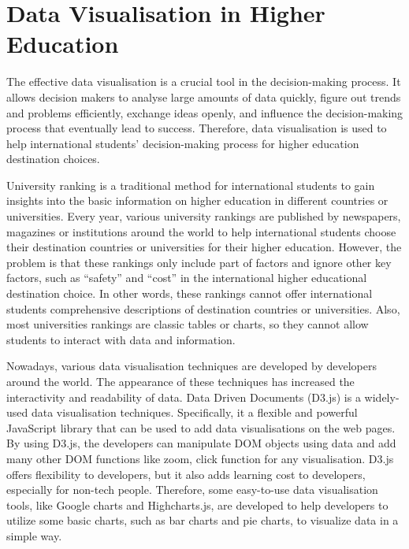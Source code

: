 \section{Data Visualisation in Higher Education
}

The effective data visualisation is a crucial tool in the decision-making process. It allows decision makers to analyse large amounts of data quickly, figure out trends and problems efficiently, exchange ideas openly, and influence the decision-making process that eventually lead to success. Therefore, data visualisation is used to help international students’ decision-making process for higher education destination choices.

University ranking is a traditional method for international students to gain insights into the basic information on higher education in different countries or universities. Every year, various university rankings are published by newspapers, magazines or institutions around the world to help international students choose their destination countries or universities for their higher education. However, the problem is that these rankings only include part of factors and ignore other key factors, such as “safety” and “cost” in the international higher educational destination choice. In other words, these rankings cannot offer international students comprehensive descriptions of destination countries or universities. Also, most universities rankings are classic tables or charts, so they cannot allow students to interact with data and information.

Nowadays, various data visualisation techniques are developed by developers around the world. The appearance of these techniques has increased the interactivity and readability of data. Data Driven Documents (D3.js) is a widely-used data visualisation techniques. Specifically, it a flexible and powerful JavaScript library that can be used to add data visualisations on the web pages. By using D3.js, the developers can manipulate DOM objects using data and add many other DOM functions like zoom, click function for any visualisation. D3.js offers flexibility to developers, but it also adds learning cost to developers, especially for non-tech people. Therefore, some easy-to-use data visualisation tools, like Google charts and Highcharts.js, are developed to help developers to utilize some basic charts, such as bar charts and pie charts, to visualize data in a simple way.

